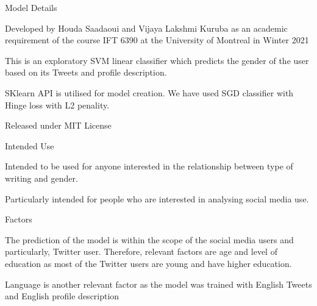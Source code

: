 \documentclass{article}
\begin{document}
 \begin{adjustwidth}{-60pt}{-30pt}
 \begin{singlespace}
 
 \begin{tcolorbox}[title=\textbf{Model Card - Tweeter Gender Classification },
     breakable, sharp corners, boxrule=0.7pt]
 
 \small{
 
 \begin{mcsection}{Model Details}
    \item Developed by Houda Saadaoui and  Vijaya Lakshmi Kuruba as an academic requirement of the course IFT 6390 at the University of Montreal in Winter 2021
     \item  This is an exploratory SVM linear classifier which predicts the gender of the user based on its Tweets and profile description.  
     \item SKlearn API is utilised for model creation. We have used SGD classifier with Hinge loss with L2 penality.
     \item Released under MIT License

 \end{mcsection}
 
 \begin{mcsection}{Intended Use}
     \item Intended to be used for anyone interested  in the relationship between type of writing and gender. 
     \item Particularly intended for people who are interested in analysing social media use.
  

 \end{mcsection}
 
 \begin{mcsection}{Factors}
     \item The prediction of the model is within the scope of the social media users and particularly, Twitter user. 
     Therefore, relevant factors are age and level of education as most of the Twitter users are young and have higher education.
    \item Language is another relevant factor as the model was trained with English Tweets and English profile description

 \end{mcsection}
 
}
\end{tcolorbox}
\end{singlespace}
\end{adjustwidth}
\end{document}
